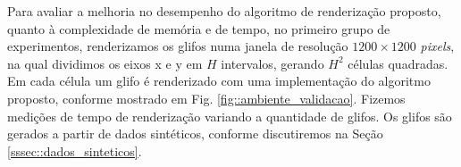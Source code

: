 Para avaliar a melhoria no desempenho do algoritmo de renderização proposto, quanto à complexidade de memória e de tempo, no primeiro grupo de experimentos, renderizamos os glifos numa janela de resolução $1200 \times 1200$ \textit{pixels}, na qual dividimos os eixos x e y em $H$ intervalos, gerando $H^2$ células quadradas. Em cada célula um glifo é renderizado com uma implementação do algoritmo proposto, conforme mostrado em Fig. \ref{fig::ambiente_validacao}. Fizemos medições de tempo de renderização variando a quantidade de glifos. Os glifos são gerados a partir de dados sintéticos, conforme discutiremos na Seção \ref{sssec::dados_sinteticos}. %

\begin{figure}[ht]
\centering
\captionsetup[subfloat]{farskip=5pt,nearskip=0pt}
    

\end{figure}
